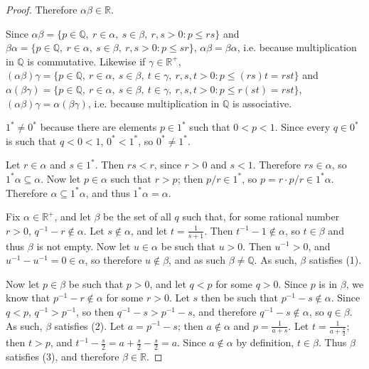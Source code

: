 \documentclass[12pt]{article}
\begin{document}
\begin{thm}
\begin{proof}
    Therefore $\alpha\beta \in \mathbb{R}$.

    Since $\alpha\beta = \{p \in \mathbb{Q},\ r \in \alpha,\ s \in \beta,\ r,s > 0: p
    \leq rs\}$ and $\beta\alpha = \{p \in \mathbb{Q},\ r \in \alpha,\ s \in \beta,\ r,s > 0: p
    \leq sr\}$, $\alpha\beta = \beta\alpha$, i.e. because multiplication in
    $\mathbb{Q}$ is commutative. Likewise if $\gamma \in \mathbb{R}^+$,
    $(\alpha\beta)\gamma = \{p \in \mathbb{Q},\ r \in \alpha,\ s \in \beta,\ t \in
    \gamma,\ r,s,t > 0: p \leq (rs)t = rst\}$ and $\alpha(\beta\gamma) = \{p \in
    \mathbb{Q},\ r \in \alpha,\ s \in \beta,\ t \in \gamma,\ r,s,t > 0: p \leq r(st)
    = rst\}$, $(\alpha\beta)\gamma = \alpha(\beta\gamma)$, i.e. because
    multiplication in $\mathbb{Q}$ is associative.

    $1^* \neq 0^*$ because there are elements $p \in 1^*$ such that $0 < p < 1$.
    Since every $q \in 0^*$ is such that $q < 0 < 1$, $0^* < 1^*$, so $0^* \neq 1^*$.

    Let $r \in \alpha$ and $s \in 1^*$. Then $rs < r$, since $r > 0$ and $s < 1$.
    Therefore $rs \in \alpha$, so $1^*\alpha \subseteq \alpha$. Now let $p \in
    \alpha$ such that $r > p$; then $p/r \in 1^*$, so $p = r \cdot p/r \in
    1^*\alpha$. Therefore $\alpha \subseteq 1^*\alpha$, and thus $1^*\alpha =
    \alpha$.

    Fix $\alpha \in \mathbb{R}^+$, and let $\beta$ be the set of all $q$ such that,
    for some rational number $r > 0$, $q^{-1} - r \notin \alpha$. Let $s \notin
    \alpha$, and let $t = \frac{1}{s + 1}$. Then $t^{-1} - 1 \notin \alpha$, so $t
    \in \beta$ and thus $\beta$ is not empty. Now let $u \in \alpha$ be such that $u
    > 0$. Then $u^{-1} > 0$, and $u^{-1} - u^{-1} = 0 \in \alpha$, so therefore $u
    \notin \beta$, and as such $\beta \neq \mathbb{Q}$. As such, $\beta$ satisfies
    (1).

    Now let $p \in \beta$ be such that $p > 0$, and let $q < p$ for some $q > 0$.
    Since $p$ is in $\beta$, we know that $p^{-1} - r \notin \alpha$ for some $r >
    0$. Let $s$ then be such that $p^{-1} - s \notin \alpha$. Since $q < p$, $q^{-1}
    > p^{-1}$, so then $q^{-1} - s > p^{-1} - s$, and therefore $q^{-1} - s \notin
    \alpha$, so $q \in \beta$. As such, $\beta$ satisfies (2). Let $a = p^{-1} - s$;
    then $a \notin \alpha$ and $p = \frac{1}{a + s}$. Let $t = \frac{1}{a +
    \frac{s}{2}}$; then $t > p$, and $t^{-1} - \frac{s}{2} = a + \frac{s}{2} -
    \frac{s}{2} = a$. Since $a \notin \alpha$ by definition, $t \in \beta$. Thus
    $\beta$ satisfies (3), and therefore $\beta \in \mathbb{R}$.


\end{proof}
\end{thm}
\end{document}

